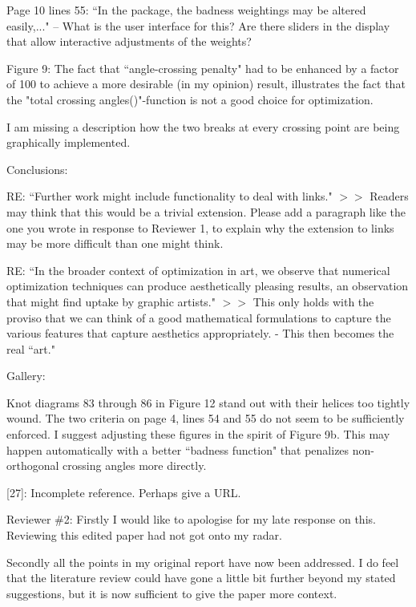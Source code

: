 \documentclass[12pt]{article}
\begin{document}
Page 10 lines 55: ``In the package, the badness weightings may be
altered easily,..."  -- What is the user interface for this?  Are
there sliders in the display that allow interactive adjustments of the
weights?

Figure 9: The fact that ``angle-crossing penalty" had to be enhanced by
a factor of 100 to achieve a more desirable (in my opinion) result,
illustrates the fact that the "total crossing angles()"-function is
not a good choice for optimization.

I am missing a description how the two breaks at every crossing point
are being graphically implemented.

Conclusions:

RE: ``Further work might include functionality to deal
with links."  $>>$ Readers may think that this would be a trivial
extension.  Please add a paragraph like the one you wrote in response
to Reviewer 1, to explain why the extension to links may be more
difficult than one might think.

RE: ``In the broader context of optimization in art, we observe that
numerical optimization techniques can produce aesthetically pleasing
results, an observation that might find uptake by graphic artists."
$>>$ This only holds with the proviso that we can think of a good
mathematical formulations to capture the various features that capture
aesthetics appropriately.  - This then becomes the real ``art."

Gallery:

Knot diagrams 83 through 86 in Figure 12 stand out with their helices
too tightly wound.  The two criteria on page 4, lines 54 and 55 do not
seem to be sufficiently enforced.  I suggest adjusting these figures
in the spirit of Figure 9b.  This may happen automatically with a
better ``badness function" that penalizes non-orthogonal crossing
angles more directly.

[27]:  Incomplete reference.  Perhaps give a URL.



Reviewer \#2: Firstly I would like to apologise for my late response on
this. Reviewing this edited paper had not got onto my radar.

Secondly all the points in my original report have now been
addressed. I do feel that the literature review could have gone a
little bit further beyond my stated suggestions, but it is now
sufficient to give the paper more context.
\end{document}
